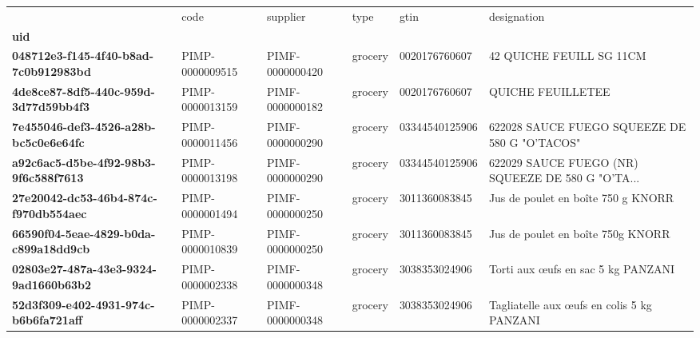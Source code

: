 \begin{table}
\centering
\label{tab:dup_gtin}
\begin{tabularx}{\linewidth}{lXXXXX}
\toprule
{} &             code &         supplier &     type &            gtin &                                        designation \\
\textbf{uid                                 } &                  &                  &          &                 &                                                    \\
\midrule
\textbf{048712e3-f145-4f40-b8ad-7c0b912983bd} &  PIMP-0000009515 &  PIMF-0000000420 &  grocery &   0020176760607 &                           42 QUICHE FEUILL SG 11CM \\
\textbf{4de8ce87-8df5-440c-959d-3d77d59bb4f3} &  PIMP-0000013159 &  PIMF-0000000182 &  grocery &   0020176760607 &                                  QUICHE FEUILLETEE \\
\textbf{7e455046-def3-4526-a28b-bc5c0e6e64fc} &  PIMP-0000011456 &  PIMF-0000000290 &  grocery &  03344540125906 &      622028 SAUCE FUEGO SQUEEZE DE 580 G "O'TACOS" \\
\textbf{a92c6ac5-d5be-4f92-98b3-9f6c588f7613} &  PIMP-0000013198 &  PIMF-0000000290 &  grocery &  03344540125906 &  622029 SAUCE FUEGO (NR) SQUEEZE DE 580 G "O'TA... \\
\textbf{27e20042-dc53-46b4-874c-f970db554aec} &  PIMP-0000001494 &  PIMF-0000000250 &  grocery &   3011360083845 &                 Jus de poulet en boîte 750 g KNORR \\
\textbf{66590f04-5eae-4829-b0da-c899a18dd9cb} &  PIMP-0000010839 &  PIMF-0000000250 &  grocery &   3011360083845 &                  Jus de poulet en boîte 750g KNORR \\
\textbf{02803e27-487a-43e3-9324-9ad1660b63b2} &  PIMP-0000002338 &  PIMF-0000000348 &  grocery &   3038353024906 &                 Torti aux œufs en sac 5 kg PANZANI \\
\textbf{52d3f309-e402-4931-974c-b6b6fa721aff} &  PIMP-0000002337 &  PIMF-0000000348 &  grocery &   3038353024906 &         Tagliatelle aux œufs en colis 5 kg PANZANI \\
\bottomrule
\end{tabularx}
\end{table}
